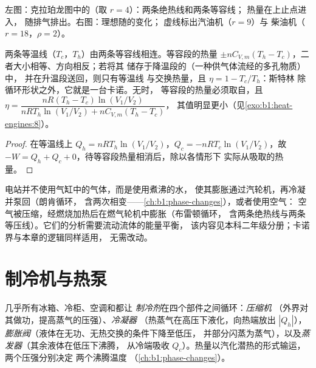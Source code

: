 \begin{omfigure}
{\small 左图：克拉珀龙图中的（取 $r = 4$）：两条绝热线和两条等容线；
热量在上止点进入，
随排气排出。右图：理想随的变化；
虚线标出汽油机（$r = 9$）与
柴油机（$r = 18$，$\rho = 2$）。}
\end{omfigure}

\begin{proposition}[斯特林循环与回热器]\label{prop:b1:heat-engines:stirling}
两条等温线（$T_c$，$T_h$）由两条等容线相连。等容段的热量
$\pm nC_{V,m}(T_h - T_c)$，二者大小相等、方向相反；若将其
储存于降温段的\emph{}（一种供气体流经的多孔物质）中，
并在升温段送回，则只有等温线
与交换热量，且 $\eta = 1 - T_c/T_h$：斯特林
除循环形状之外，它就是一台卡诺。无时，
等容段的热量必须取自，且
$\eta = \dfrac{nR(T_h - T_c)\ln(V_1/V_2)}{nRT_h\ln(V_1/V_2) + nC_{V,m}(T_h - T_c)}$，
其值明显更小（见\cref{exo:b1:heat-engines:8}）。
\end{proposition}

\begin{proof}
在等温线上 $Q_h = nRT_h\ln(V_1/V_2)$，$Q_c = -nRT_c\ln(V_1/V_2)$，故
$-W = Q_h + Q_c + 0$，待等容段热量相消后，除以各情形下
实际从吸取的热量。
\end{proof}

\begin{remark}[蒸汽轮机与燃气轮机]\label{rem:b1:heat-engines:turbines}
电站并不使用气缸中的气体，而是使用煮沸的水，
使其膨胀通过汽轮机，再冷凝并泵回（朗肯循环，
含两次相变——\cref{ch:b1:phase-changes}），或者使用空气：
空气被压缩，经燃烧加热后在燃气轮机中膨胀（布雷顿循环，
含两条绝热线与两条等压线）。它们的分析需要流动流体的能量平衡，
该内容见本科二年级分册；卡诺界与本章的逻辑同样适用，
无需改动。
\end{remark}

\section{制冷机与热泵}

\begin{definition}[蒸气压缩循环]\label{def:b1:heat-engines:vapourcycle}
几乎所有冰箱、冷柜、空调和都让
\emph{制冷剂}在四个部件之间循环：\emph{压缩机}
（外界对其做功，提高蒸气的压强）、\emph{冷凝器}
（热蒸气在高压下液化，向热端放出
$|Q_h|$），\emph{膨胀阀}（液体在无功、无热交换的条件下降至低压，
并部分闪蒸为蒸气），以及\emph{蒸发器}（其余液体在低压下沸腾，
从冷端吸收 $Q_c$）。热量以汽化潜热的形式输运，
两个压强分别决定
两个沸腾温度
（\cref{ch:b1:phase-changes}）。
\end{definition}

